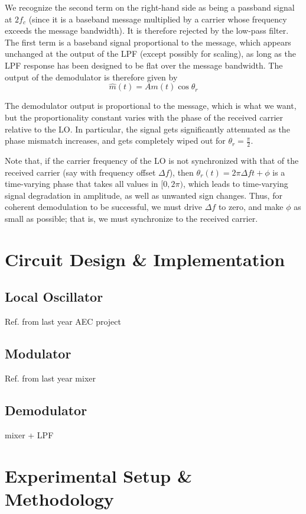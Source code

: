 \documentclass[conference]{IEEEtran}
\begin{document}
We recognize the second term on the right-hand side as being a passband signal at \(2f_c\) (since it is a baseband message multiplied by a carrier whose frequency exceeds the message bandwidth). It is therefore rejected by the low-pass filter. The first term is a baseband signal proportional to the message, which appears unchanged at the output of the LPF (except possibly for scaling), as long as the LPF response has been designed to be flat over the message bandwidth. The output of the demodulator is therefore given by
\[
    \hat{m}(t) = A m(t) \cos\theta_r 
\]

The demodulator output is proportional to the message, which is what we want, but the proportionality constant varies with the phase of the received carrier relative to the LO. In particular, the signal gets significantly attenuated as the phase mismatch increases, and gets completely wiped out for \(\theta_r = \frac{\pi}{2}\).

Note that, if the carrier frequency of the LO is not synchronized with that of the received carrier (say with frequency offset \(\Delta f\)), then \(\theta_r(t) = 2\pi \Delta f t + \phi\) is a time-varying phase that takes all values in \([0, 2\pi)\), which leads to time-varying signal degradation in amplitude, as well as unwanted sign changes. Thus, for coherent demodulation to be successful, we must drive \(\Delta f\) to zero, and make \(\phi\) as small as possible; that is, we must synchronize to the received carrier.




\section{Circuit Design \& Implementation}
\subsection{Local Oscillator}
Ref. from last year AEC project
\subsection{Modulator}

Ref. from last year mixer
\subsection{Demodulator}
mixer + LPF



\section{Experimental Setup \& Methodology}
\end{document}

